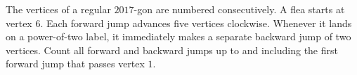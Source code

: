 The vertices of a regular $2017$-gon are numbered consecutively. A flea starts at vertex $6$. Each forward jump advances five vertices clockwise. Whenever it lands on a power-of-two label, it immediately makes a separate backward jump of two vertices. Count all forward and backward jumps up to and including the first forward jump that passes vertex $1$.
